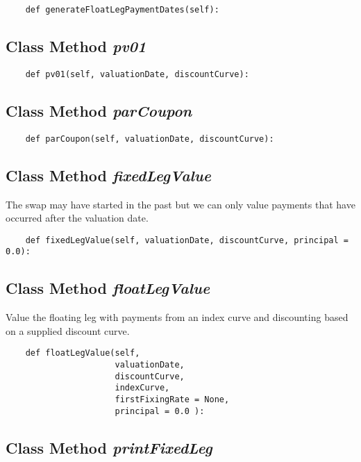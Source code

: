 \documentclass[twoside,11pt]{book}
\begin{document}
\begin{lstlisting}
    def generateFloatLegPaymentDates(self):
\end{lstlisting}

\subsection{Class Method {\it pv01}}


\begin{lstlisting}
    def pv01(self, valuationDate, discountCurve):
\end{lstlisting}

\subsection{Class Method {\it parCoupon}}


\begin{lstlisting}
    def parCoupon(self, valuationDate, discountCurve):
\end{lstlisting}

\subsection{Class Method {\it fixedLegValue}}
The swap may have started in the past but we can only value payments that have occurred after the valuation date. 

\begin{lstlisting}
    def fixedLegValue(self, valuationDate, discountCurve, principal = 0.0):
\end{lstlisting}

\subsection{Class Method {\it floatLegValue}}
Value the floating leg with payments from an index curve and discounting based on a supplied discount curve. 

\begin{lstlisting}
    def floatLegValue(self, 
                      valuationDate, 
                      discountCurve, 
                      indexCurve, 
                      firstFixingRate = None,
                      principal = 0.0 ):
\end{lstlisting}

\subsection{Class Method {\it printFixedLeg}}
\end{document}

